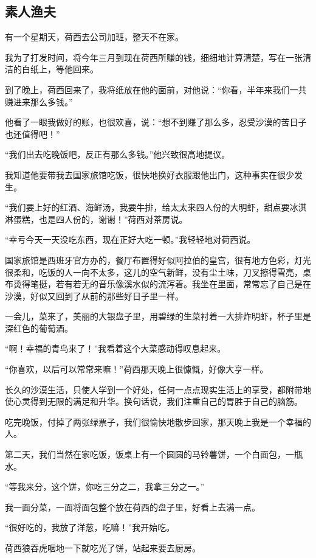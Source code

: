 \subsection{素人渔夫}


\par 有一个星期天，荷西去公司加班，整天不在家。
\par 我为了打发时间，将今年三月到现在荷西所赚的钱，细细地计算清楚，写在一张清洁的白纸上，等他回来。
\par 到了晚上，荷西回来了，我将纸放在他的面前，对他说：“你看，半年来我们一共赚进来那么多钱。”
\par 他看了一眼我做好的账，也很欢喜，说：“想不到赚了那么多，忍受沙漠的苦日子也还值得吧！”
\par “我们出去吃晚饭吧，反正有那么多钱。”他兴致很高地提议。
\par 我知道他要带我去国家旅馆吃饭，很快地换好衣服跟他出门，这种事实在很少发生。
\par “我们要上好的红酒、海鲜汤，我要牛排，给太太来四人份的大明虾，甜点要冰淇淋蛋糕，也是四人份的，谢谢！”荷西对茶房说。
\par “幸亏今天一天没吃东西，现在正好大吃一顿。”我轻轻地对荷西说。
\par 国家旅馆是西班牙官方办的，餐厅布置得好似阿拉伯的皇宫，很有地方色彩，灯光很柔和，吃饭的人一向不太多，这儿的空气新鲜，没有尘土味，刀叉擦得雪亮，桌布烫得笔挺，若有若无的音乐像溪水似的流泻着。我坐在里面，常常忘了自己是在沙漠，好似又回到了从前的那些好日子里一样。
\par 一会儿，菜来了，美丽的大银盘子里，用碧绿的生菜衬着一大排炸明虾，杯子里是深红色的葡萄酒。
\par “啊！幸福的青鸟来了！”我看着这个大菜感动得叹息起来。
\par “你喜欢，以后可以常常来嘛！”荷西那天晚上很慷慨，好像大亨一样。
\par 长久的沙漠生活，只使人学到一个好处，任何一点点现实生活上的享受，都附带地使心灵得到无限的满足和升华。换句话说，我们注重自己的胃胜于自己的脑筋。
\par 吃完晚饭，付掉了两张绿票子，我们很愉快地散步回家，那天晚上我是一个幸福的人。
\par 第二天，我们当然在家吃饭，饭桌上有一个圆圆的马铃薯饼，一个白面包，一瓶水。
\par “等我来分，这个饼，你吃三分之二，我拿三分之一。”
\par 我一面分菜，一面将面包整个放在荷西的盘子里，好看上去满一点。
\par “很好吃的，我放了洋葱，吃嘛！”我开始吃。
\par 荷西狼吞虎咽地一下就吃光了饼，站起来要去厨房。
